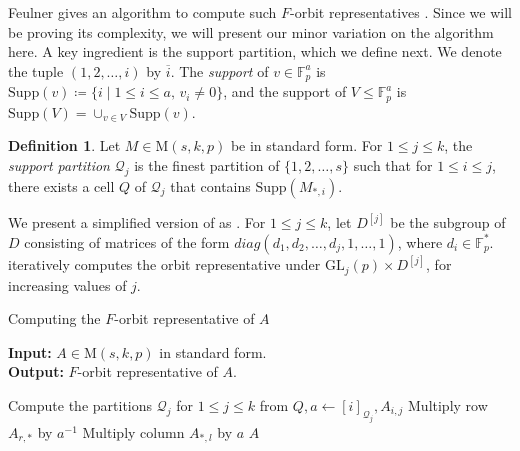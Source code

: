 \documentclass[11pt,a4paper]{article}
\theoremstyle{definition}
\newtheorem{definition}[theorem]{Definition}
\theoremstyle{remark}
\newcommand{\Supp}{\mathrm{Supp}}
\begin{document}
Feulner gives an algorithm to compute such $F$-orbit representatives \cite[Algorithm~1]{feulner}. Since we will be proving its complexity, we will present our minor variation on the algorithm here.
A key ingredient is the support partition, which we define next. 
We denote the tuple $(1,2, \ldots, i)$ by $\overline{i}$. 
The \emph{support} of $v \in \mathds{F}_p^a$ is $\Supp(v) \coloneqq  \{i \mid  1 \leq i \leq {a}, \, v_i \neq 0 \}$, and the support of $V \leq \mathds{F}_p^a$ is $\Supp(V) = \cup_{ v \in V} \Supp(v)$. %


\begin{definition}\label{feulner's supp partn}
Let $M \in \mathrm{M}(s, k, p)$ be in standard form. 
For $1 \leq j \leq {k}$, 
the \emph{support partition} $\mathcal{Q}_j$ is the finest partition of $\{1,2, \ldots, s \}$ such that for $1 \leq i \leq {j}$, there exists a cell $Q$ of $\mathcal{Q}_j$ that contains $\Supp(M_{*,i})$.
\end{definition}

We present a simplified version of \cite[Algorithm~1]{feulner} as . For $1 \leq j \leq k$, let $D^{[j]}$ be the subgroup of $D$ consisting of matrices of the form $diag(d_1, d_2, \ldots ,d_j, 1, \ldots, 1)$, where $d_i \in \mathds{F}_p^*$. 
 iteratively computes the orbit representative under $\mathrm{GL}_j(p) \times D^{[j]}$, for increasing values of $j$. 

\begin{algorithm} [ht]
\caption{Computing the $F$-orbit representative of $A$}
\label{algm: semicanon}
\textbf{Input: } $A \in \mathrm{M}(s,k,p)$ in standard form. \\
\textbf{Output: } $F$-orbit representative of $A$. 
\begin{algorithmic}[1]
\State Compute the partitions $\mathcal{Q}_j$ for $1 \leq j \leq k$ from   
  
        \State $Q,a \gets [i]_{\mathcal{Q}_j}, A_{i,j}$ 
                Multiply row $A_{r,*}$ by $a^{-1}$ 
            \EndForr {}
             
                    Multiply column $A_{*,l}$ by $a$ 
                \EndIIf {}
            \EndFor
        \EndIf
\EndFor    
\State \Return $A$ %
\end{algorithmic}
\end{algorithm}
\end{document}
